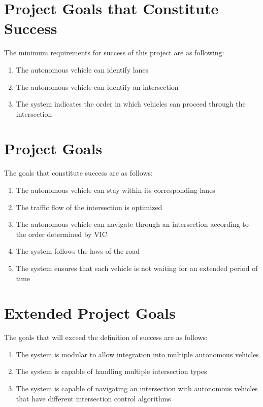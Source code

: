 \documentclass [12pt]{article}
\begin{document}
\section{Project Goals that Constitute Success }
The minimum requirements for success of this project are as following:
\begin{enumerate}
	\setlength\itemsep{-0.3em}
	\item The autonomous vehicle can identify lanes
	\item The autonomous vehicle can identify an intersection
	\item The system indicates the order in which vehicles can proceed through the intersection
\end{enumerate}

\section{Project Goals}
The goals that constitute success are as follows: 
\begin{enumerate}
	\setlength\itemsep{-0.3em}
	\item The autonomous vehicle can stay within its corresponding lanes
	\item The traffic flow of the intersection is optimized
	\item The autonomous vehicle can navigate through an intersection according to the order determined by VIC
	\item The system follows the laws of the road 
	\item The system ensures that each vehicle is not waiting for an extended period of time 
\end{enumerate}

\section{Extended Project Goals}
The goals that will exceed the definition of success are as follows: 
\begin{enumerate}
	\setlength\itemsep{-0.3em}
	\item The system is modular to allow integration into multiple autonomous vehicles
	\item The system is capable of handling multiple intersection types
	\item The system is capable of navigating an intersection with autonomous vehicles that have different intersection control algorithms
\end{enumerate}
\end{document}
